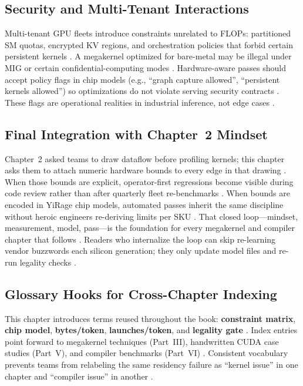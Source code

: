 \subsection{Security and Multi-Tenant Interactions}
\label{sec:ch03_security}

Multi-tenant GPU fleets introduce constraints unrelated to FLOPs: partitioned SM quotas, encrypted KV regions, and orchestration policies that forbid certain persistent kernels \citep{patel2025llminference,kwon2023vllm}.
A megakernel optimized for bare-metal may be illegal under MIG or certain confidential-computing modes \citep{nvidia2022hopper}.
Hardware-aware passes should accept policy flags in chip models (e.g., ``graph capture allowed'', ``persistent kernels allowed'') so optimizations do not violate serving security contracts \citep{nvidia2024cudagraphs,patel2025llminference}.
These flags are operational realities in industrial inference, not edge cases \citep{liu2024deepseekv3}.

\subsection{Final Integration with Chapter~2 Mindset}
\label{sec:ch03_integration}

Chapter~2 asked teams to draw dataflow before profiling kernels; this chapter asks them to attach numeric hardware bounds to every edge in that drawing \citep{patel2025llminference,memoryfloor2026,dlbook}.
When those bounds are explicit, operator-first regressions become visible during code review rather than after quarterly fleet re-benchmarks \citep{taxbreak2026}.
When bounds are encoded in YiRage chip models, automated passes inherit the same discipline without heroic engineers re-deriving limits per SKU \citep{amd2024xdna,nvidia2022hopper}.
That closed loop---mindset, measurement, model, pass---is the foundation for every megakernel and compiler chapter that follows \citep{patel2025llminference,memoryfloor2026,semianalysis2024tma}.
Readers who internalize the loop can skip re-learning vendor buzzwords each silicon generation; they only update model files and re-run legality checks \citep{nvidia2022hopper,amd2024xdna,dlbook}.

\subsection{Glossary Hooks for Cross-Chapter Indexing}
\label{sec:ch03_glossary}

This chapter introduces terms reused throughout the book: \textbf{constraint matrix}, \textbf{chip model}, \textbf{bytes/token}, \textbf{launches/token}, and \textbf{legality gate} \citep{taxbreak2026,memoryfloor2026,patel2025llminference}.
Index entries point forward to megakernel techniques (Part~III), handwritten CUDA case studies (Part~V), and compiler benchmarks (Part~VI) \citep{nvidia2022hopper,amd2024xdna,dlbook}.
Consistent vocabulary prevents teams from relabeling the same residency failure as ``kernel issue'' in one chapter and ``compiler issue'' in another \citep{patel2025llminference,taxbreak2026}.

